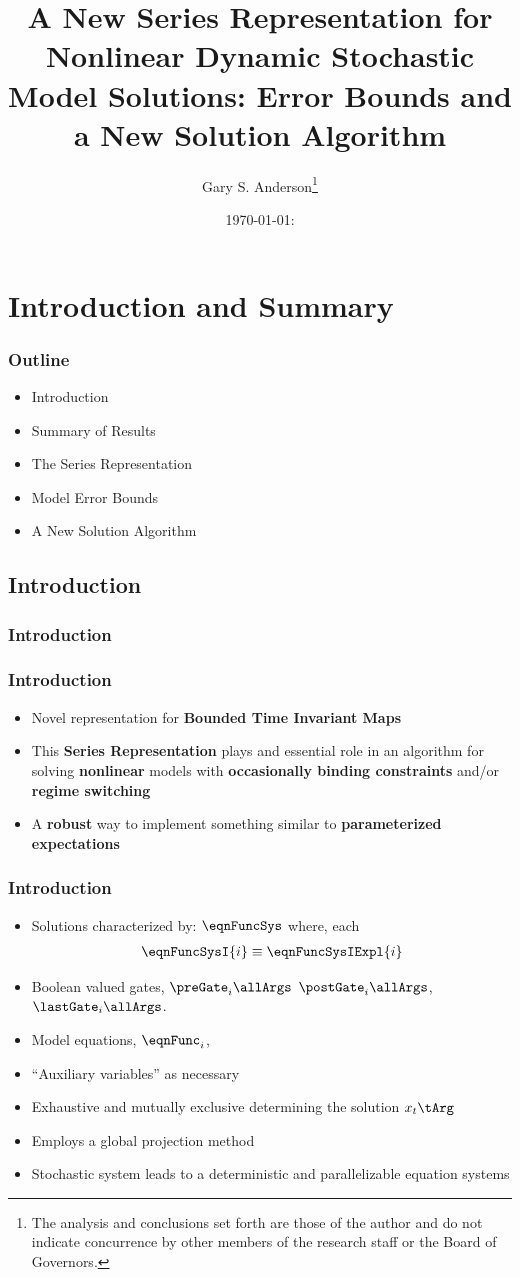 \documentclass[notheorems]{beamer}
\author{Gary S. Anderson\thanks{The analysis and conclusions set forth are those of the author and do not indicate concurrence by other members of the research staff or the Board of Governors.}}
\title{A New Series Representation for 
Nonlinear Dynamic Stochastic Model Solutions:  Error Bounds and a New Solution Algorithm}
\date{\today: \currenttime}
\begin{document}
\begin{frame}
\maketitle
\end{frame}

\section{Introduction and Summary}

\begin{frame}
  \frametitle{Outline}
  \begin{itemize}
  \item Introduction
  \item Summary of Results
  \item The Series Representation
  \item Model Error Bounds
  \item A New Solution Algorithm
  \end{itemize}
\end{frame}

\subsection{Introduction}
  \frametitle{Introduction}
\label{sec:introduction0}
\begin{frame}
  \frametitle{Introduction}
  \begin{itemize}
  \item Novel representation for {\bf Bounded Time Invariant Maps}
  \item This {\bf Series Representation} plays and essential role in an algorithm for solving {\bf nonlinear} models with {\bf occasionally binding constraints} and/or {\bf regime switching}
  \item A {\bf robust} way to implement something similar to {\bf parameterized expectations}
  \end{itemize}
\end{frame}

\begin{frame}
  \frametitle{Introduction}
{\small
\begin{itemize}
\item Solutions characterized by: $\eqnFuncSys$  where, each 
\begin{gather}
\eqnFuncSysI{i}\equiv \eqnFuncSysIExpl{i} \label{eqnGates}
\end{gather}
\item Boolean valued gates, $\preGate_i\allArgs$ $\postGate_i\allArgs$,
$\lastGate_i\allArgs$. 
\item Model equations, $\eqnFunc_i$,  
\item ``Auxiliary variables'' as necessary
\item Exhaustive and mutually exclusive determining the solution  $x_t\tArg$
\item Employs a global projection method
\item Stochastic system leads to a deterministic and parallelizable equation systems
\end{itemize}
}
\end{frame}
\end{document}

